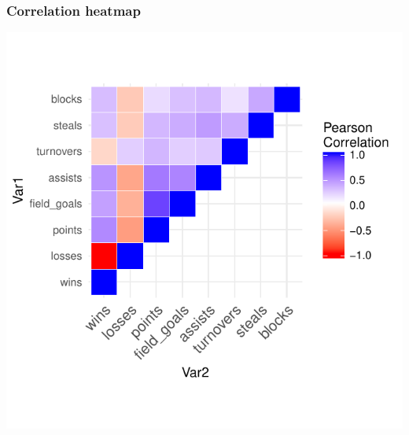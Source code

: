 \documentclass[12pt]{beamer}\usepackage[]{graphicx}\usepackage[]{color}
\newenvironment{knitrout}{}{} %
\begin{document}
\begin{frame}[fragile]
\frametitle{Correlation heatmap}

\begin{knitrout}\footnotesize
{}\color{fgcolor}

{\centering \includegraphics[width=.9\linewidth,height=.9\linewidth]{figure/cormat-1} 

}



\end{knitrout}

\end{frame}

\end{document}
